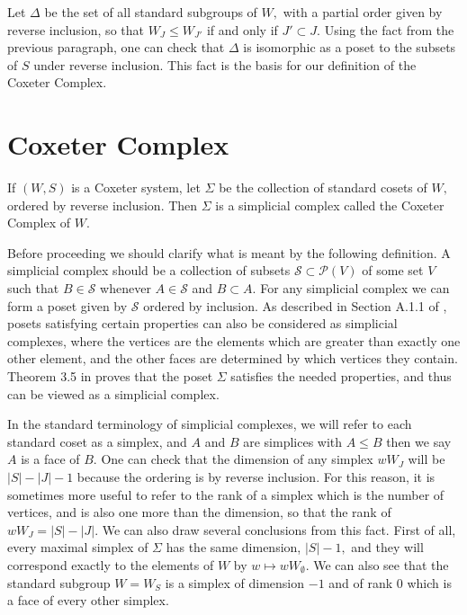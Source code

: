 \documentclass[class=book, crop=false,12 pt]{standalone}
\begin{document}
Let $\Delta$ be the set of all standard subgroups of $W,$ with a partial order given by reverse inclusion, so that $W_J\le W_{J'}$ if and only if $J'\subset J.$ Using the fact from the previous paragraph, one can check that $\Delta$ is isomorphic as a poset to the subsets of $S$ under reverse inclusion. This fact is the basis for our definition of the Coxeter Complex.

\section{Coxeter Complex}
\begin{defn}
	If $(W,S)$ is a Coxeter system, let $\Sigma$ be the collection of standard cosets of $W,$ ordered by reverse inclusion. Then $\Sigma$ is a simplicial complex called the Coxeter Complex of $W.$
\end{defn}

Before proceeding we should clarify what is meant by the following definition. A simplicial complex should be a collection of subsets $\mathcal{S}\subset \mathcal{P}(V)$ of some set $V$ such that $B\in \mathcal{S}$ whenever $A\in \mathcal{S}$ and $B\subset A.$ For any simplicial complex we can form a poset given by $\mathcal{S}$ ordered by inclusion. As described in Section A.1.1 of \cite{buildings}, posets satisfying certain properties can also be considered as simplicial complexes, where the vertices are the elements which are greater than exactly one other element, and the other faces are determined by which vertices they contain. Theorem 3.5 in \cite{buildings} proves that the poset $\Sigma$ satisfies the needed properties, and thus can be viewed as a simplicial complex.

In the standard terminology of simplicial complexes, we will refer to each standard coset as a simplex, and $A$ and $B$ are simplices with $A\le B$ then we say $A$ is a face of $B.$ One can check that the dimension of any simplex $wW_J$ will be $|S|-|J|-1$ because the ordering is by reverse inclusion. For this reason, it is sometimes more useful to refer to the rank of a simplex which is the number of vertices, and is also one more than the dimension, so that the rank of $wW_J=|S|-|J|.$ We can also draw several conclusions from this fact. First of all, every maximal simplex of $\Sigma$ has the same dimension, $|S|-1,$ and they will correspond exactly to the elements of $W$ by $w\mapsto wW_\emptyset.$ We can also see that the standard subgroup $W=W_S$ is a simplex of dimension $-1$ and of rank 0 which is a face of every other simplex.
\end{document}
